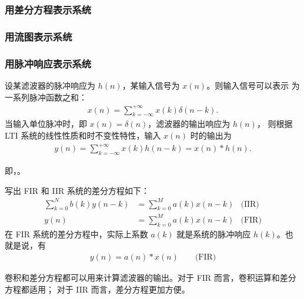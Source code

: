 
\subsubsection{用差分方程表示系统}

\subsubsection{用流图表示系统}

\subsubsection{用脉冲响应表示系统}

\begin{theorem}
    设某滤波器的脉冲响应为 $h(n)$，某输入信号为 $x(n)$。则输入信号可以表示
    为一系列脉冲函数之和：
    \begin{align*}
        x(n) = \sum_{k = -\infty}^{+\infty}x(k)\delta(n - k).
    \end{align*}
    当输入单位脉冲时，即 $x(n) = \delta(n)$，滤波器的输出响应为 $h(n)$，
    则根据 LTI 系统的线性性质和时不变性特性，输入 $x(n)$ 时的输出为
    \begin{align*}
        y(n) = \sum_{k = -\infty}^{+\infty}x(k)h(n - k) = x(n) * h(n).
    \end{align*}
    
    即，。
\end{theorem}

\begin{property}[差分方程与卷积运算]
    \label{property:diff-equation-convolution}
    写出 FIR 和 IIR 系统的差分方程如下：
    \begin{align*}
        \sum_{k = 0}^{N}b(k)y(n - k) & = \sum_{k = 0}^{M}a(k)x(n - k) & \text{(IIR)} \\
        y(n) & = \sum_{k = 0}^{M}a(k)x(n - k) & \text{(FIR)}
    \end{align*}
    在 FIR 系统的差分方程中，实际上系数 $a(k)$ 就是系统的脉冲响应 $h(k)$。也就是说，有
    \begin{align*}
        y(n) = a(n) * x(n) \qquad \text{(FIR)}
    \end{align*}

    卷积和差分方程都可以用来计算滤波器的输出。对于 FIR 而言，卷积运算和差分方程都适用；
    对于 IIR 而言，差分方程更加方便。
\end{property}

